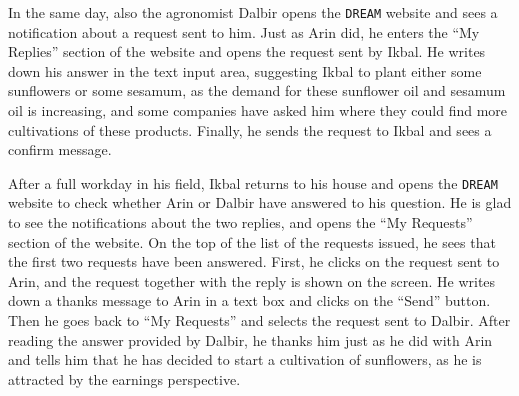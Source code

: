 \documentclass{article}
\begin{document}
\par
\noindent
In the same day, also the agronomist Dalbir opens the \verb|DREAM| website and sees a notification about a request sent to him. Just as Arin did, he enters the “My Replies” section of the website and opens the request sent by Ikbal. He writes down his answer in the text input area, suggesting Ikbal to plant either some sunflowers or some sesamum, as the demand for these sunflower oil and sesamum oil is increasing, and some companies have asked him where they could find more cultivations of these products. Finally, he sends the request to Ikbal and sees a confirm message.
\par
\noindent
After a full workday in his field, Ikbal returns to his house and opens the \verb|DREAM| website to check whether Arin or Dalbir have answered to his question. He is glad to see the notifications about the two  replies, and opens the “My Requests” section of the website. On the top of the list of the requests issued, he sees that the first two requests have been answered. First, he clicks on the request sent to Arin, and the request together with the reply is shown on the screen. He writes down a thanks message to Arin in a text box and clicks on the “Send” button.
Then he goes back to “My Requests” and selects the request sent to Dalbir. After reading the answer provided by Dalbir, he thanks him just as he did with Arin and tells him that he has decided to start a cultivation of sunflowers, as he is attracted by the earnings perspective.
\end{document}

